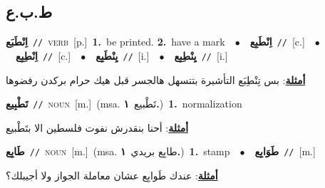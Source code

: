 \documentclass[10pt,a4paper,twoside]{article} %
\begin{document}
\begin{multicols}{2}
\vspace{-3mm}
\subsection*{\color{blue}\foreignlanguage{arabic}{ط.ب.ع}\color{blue}{}} 

{\setlength\topsep{0pt}\textbf{\foreignlanguage{arabic}{اِنْطَبَع}}\ {\color{gray}\texttt{//}\color{black}}\ \textsc{verb}\ [p.]\ \textbf{1.}~be printed.  \textbf{2.}~have a mark\ \ $\bullet$\ \ \setlength\topsep{0pt}\textbf{\foreignlanguage{arabic}{اِنْطَبِع}}\ {\color{gray}\texttt{//}\color{black}}\ [c.]\ \ $\bullet$\ \ \setlength\topsep{0pt}\textbf{\foreignlanguage{arabic}{اِنْطِبِع}}\ {\color{gray}\texttt{//}\color{black}}\ [c.]\ \ $\bullet$\ \ \setlength\topsep{0pt}\textbf{\foreignlanguage{arabic}{يِنْطَبِع}}\ {\color{gray}\texttt{//}\color{black}}\ [i.]\ \ $\bullet$\ \ \setlength\topsep{0pt}\textbf{\foreignlanguage{arabic}{يِنْطِبِع}}\ {\color{gray}\texttt{//}\color{black}}\ [i.]\  \begin{flushright}\color{gray}\foreignlanguage{arabic}{\textbf{\underline{\foreignlanguage{arabic}{أمثلة}}}: بس تِنْطِبَع التأشيرة بتتسهل هالجسر قبل هيك حرام بركدن رفضوها}\end{flushright}\color{black}} \vspace{2mm}

{\setlength\topsep{0pt}\textbf{\foreignlanguage{arabic}{تَطْبِيع}}\ {\color{gray}\texttt{//}\color{black}}\ \textsc{noun}\ [m.]\ \color{gray}(msa. \foreignlanguage{arabic}{تَطْبيع}~\foreignlanguage{arabic}{\textbf{١.}})\color{black}\ \textbf{1.}~normalization\  \begin{flushright}\color{gray}\foreignlanguage{arabic}{\textbf{\underline{\foreignlanguage{arabic}{أمثلة}}}: أحنا بنقدرش نفوت فلسطين الا بتَطْبيع}\end{flushright}\color{black}} \vspace{2mm}

{\setlength\topsep{0pt}\textbf{\foreignlanguage{arabic}{طَابِع}}\ {\color{gray}\texttt{//}\color{black}}\ \textsc{noun}\ [m.]\ \color{gray}(msa. \foreignlanguage{arabic}{طابِع بريدي}~\foreignlanguage{arabic}{\textbf{١.}})\color{black}\ \textbf{1.}~stamp\ \ $\bullet$\ \ \setlength\topsep{0pt}\textbf{\foreignlanguage{arabic}{طَوَابِع}}\ {\color{gray}\texttt{//}\color{black}}\ [m.]\  \begin{flushright}\color{gray}\foreignlanguage{arabic}{\textbf{\underline{\foreignlanguage{arabic}{أمثلة}}}: عندك طَوابِع عشان معاملة الجواز ولا أجيبلك؟}\end{flushright}\color{black}} \vspace{2mm}


\end{multicols}
\end{document}
